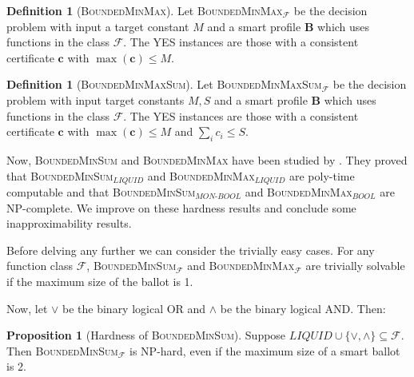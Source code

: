 \documentclass[11pt,a4paper, titlepage]{article}
\theoremstyle{definition}
\newtheorem{definition}[theorem]{Definition}
\newtheorem{proposition}[theorem]{Proposition}
\let\vec\mathbf
\begin{document}
\begin{definition}[\textsc{BoundedMinMax}]
    Let \textsc{BoundedMinMax}$_\mathcal{F}$ be the decision problem with input a target constant $M$ and a smart profile $\mathbf{B}$ which uses functions in the class $\mathcal{F}$. The YES instances are those with a consistent certificate  $\vec{c}$ with $\max(\vec{c}) \leq M$. 
\end{definition}

\begin{definition}[\textsc{BoundedMinMaxSum}]
    Let \textsc{BoundedMinMaxSum}$_\mathcal{F}$ be the decision problem with input target constants $M, S$ and a smart profile $\mathbf{B}$ which uses functions in the class $\mathcal{F}$. The YES instances are those with a consistent certificate  $\vec{c}$ with $\max (\vec{c}) \leq M$ and $\sum_i c_i \leq S$.
\end{definition}


Now, \textsc{BoundedMinSum} and \textsc{BoundedMinMax} have been studied by \citeauthor{grandi}.
They proved that \textsc{BoundedMinSum}$_\mathit{LIQUID}$ and \textsc{BoundedMinMax}$_\mathit{LIQUID}$ are poly-time computable and that \textsc{BoundedMinSum}$_\mathit{MON\text{-}BOOL}$ and \textsc{BoundedMinMax}$_\mathit{BOOL}$ are NP-complete.
We improve on these hardness results and conclude some inapproximability results.

Before delving any further we can consider the trivially easy cases. 
For any function class $\mathcal{F}$, \textsc{BoundedMinSum}$_\mathcal{F}$ and \textsc{BoundedMinMax}$_\mathcal{F}$ are trivially solvable if the maximum size of the ballot is 1.

Now, let $\lor$ be the binary logical OR and $\land$ be the binary logical AND. Then:

\begin{proposition}[Hardness of \textsc{BoundedMinSum}]
    Suppose $\mathit{LIQUID} \cup \{\lor, \land\} \subseteq \mathcal{F}$. Then \textsc{BoundedMinSum}$_\mathcal{F}$ is NP-hard, even if the maximum size of a smart ballot is 2.    
\end{proposition}
\end{document}
